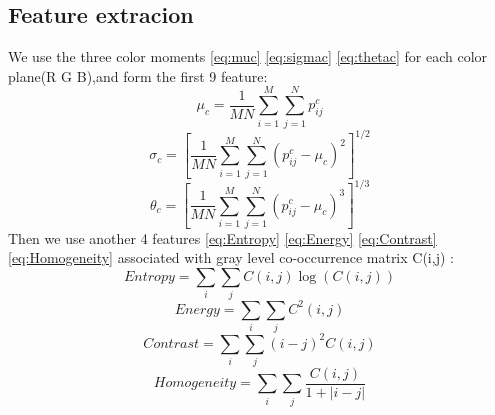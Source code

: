 \documentclass[14pt]{report} %
\begin{document}
\subsection{Feature extracion}
We use the three color moments \cref{eq:muc} \cref{eq:sigmac} \cref{eq:thetac} for each color plane(R G B),and form the first 9 feature:
\begin{equation}
\mu_{c} = \frac{1}{MN} \sum_{i=1}^M \sum_{j=1}^N p_{ij}^c
\label{eq:muc}
\end{equation}
\begin{equation}
\sigma_{c} = \left[\frac{1}{MN} \sum_{i=1}^M \sum_{j=1}^N \left(p_{ij}^c-\mu_{c}\right)^2 \right]^{1/2}
\label{eq:sigmac}
\end{equation}
\begin{equation}
\theta_{c} = \left[\frac{1}{MN} \sum_{i=1}^M \sum_{j=1}^N \left(p_{ij}^c-\mu_{c}\right)^3 \right]^{1/3}
\label{eq:thetac}
\end{equation}
Then we use another 4 features \cref{eq:Entropy} \cref{eq:Energy} \cref{eq:Contrast}  \cref{eq:Homogeneity} associated with gray level co-occurrence matrix C(i,j) :
\begin{equation}
Entropy = \sum_{i}\sum_{j}C\left(i,j\right)\log(C\left(i,j\right))
\label{eq:Entropy}
\end{equation}
\begin{equation}
Energy = \sum_{i}\sum_{j}C^2\left(i,j\right)
\label{eq:Energy}
\end{equation}
\begin{equation}
Contrast = \sum_{i}\sum_{j}\left(i-j\right)^2 C\left(i,j\right)
\label{eq:Contrast}
\end{equation}
\begin{equation}
Homogeneity = \sum_{i}\sum_{j}\frac{C\left(i,j\right)}{1+\left|i-j\right|}
\label{eq:Homogeneity}
\end{equation}
\end{document}
